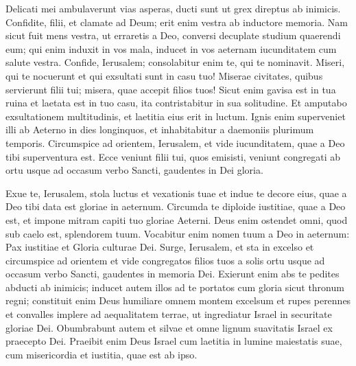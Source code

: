 \begin{biblechapter}
\verse Delicati mei ambulaverunt vias asperas, ducti sunt ut grex direptus ab inimicis. 
\verse Confidite, filii, et clamate ad Deum; erit enim vestra ab inductore memoria. 
\verse Nam sicut fuit mens vestra, ut erraretis a Deo, conversi decuplate studium quaerendi eum; 
\verse qui enim induxit in vos mala, inducet in vos aeternam iucunditatem cum salute vestra. 
\verse Confide, Ierusalem; consolabitur enim te, qui te nominavit. 
\verse Miseri, qui te nocuerunt et qui exsultati sunt in casu tuo! 
\verse Miserae civitates, quibus servierunt filii tui; misera, quae accepit filios tuos! 
\verse Sicut enim gavisa est in tua ruina et laetata est in tuo casu, ita contristabitur in sua solitudine. 
\verse Et amputabo exsultationem multitudinis, et laetitia eius erit in luctum. 
\verse Ignis enim superveniet illi ab Aeterno in dies longinquos, et inhabitabitur a daemoniis plurimum temporis. 
\verse Circumspice ad orientem, Ierusalem, et vide iucunditatem, quae a Deo tibi superventura est. 
\verse Ecce veniunt filii tui, quos emisisti, veniunt congregati ab ortu usque ad occasum verbo Sancti, gaudentes in Dei gloria. 
\end{biblechapter}

\begin{biblechapter}  
\verse Exue te, Ierusalem, stola luctus et vexationis tuae et indue te decore eius, quae a Deo tibi data est gloriae in aeternum. 
\verse Circumda te diploide iustitiae, quae a Deo est, et impone mitram capiti tuo gloriae Aeterni. 
\verse Deus enim ostendet omni, quod sub caelo est, splendorem tuum. 
\verse Vocabitur enim nomen tuum a Deo in aeternum: Pax iustitiae et Gloria culturae Dei. 
\verse Surge, Ierusalem, et sta in excelso et circumspice ad orientem et vide congregatos filios tuos a solis ortu usque ad occasum verbo Sancti, gaudentes in memoria Dei. 
\verse Exierunt enim abs te pedites abducti ab inimicis; inducet autem illos ad te portatos cum gloria sicut thronum regni; 
\verse constituit enim Deus humiliare omnem montem excelsum et rupes perennes et convalles implere ad aequalitatem terrae, ut ingrediatur Israel in securitate gloriae Dei. 
\verse Obumbrabunt autem et silvae et omne lignum suavitatis Israel ex praecepto Dei. 
\verse Praeibit enim Deus Israel cum laetitia in lumine maiestatis suae, cum misericordia et iustitia, quae est ab ipso. 
\end{biblechapter}

